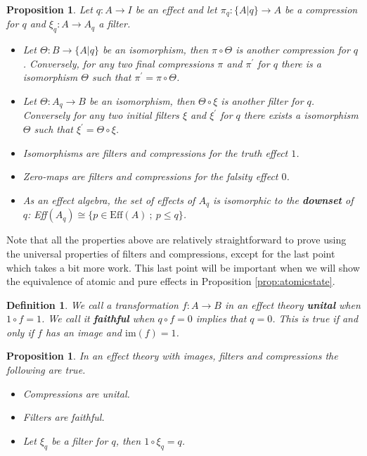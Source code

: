 \documentclass[b5paper,onecolumn,12pt,accepted=2019-05-03, issue=1, volume=1, shorttitle=papers/compositionality-1-1]{compositionalityarticle}
\newcounter{counter}
\numberwithin{counter}{section}
\newtheorem{proposition}[counter]{Proposition}
\newtheorem{definition}[counter]{Definition}
\newcommand{\im}[1]{\text{im}(#1)}
\begin{document}
\begin{proposition} \label{prop:quotcompr}
	\cite{cho2015introduction} Let $q:A\rightarrow I$ be an effect and let $\pi_q:\{A\lvert q\}\rightarrow A$ be a compression for $q$ and $\xi_q:A\rightarrow A_q$ a filter. 
	\begin{itemize}
		\item Let $\Theta:B\rightarrow \{A\lvert q\}$ be an isomorphism, then $\pi\circ \Theta$ is another compression for $q$. Conversely, for any two final compressions $\pi$ and $\pi^\prime$ for $q$ there is a isomorphism $\Theta$ such that $\pi^\prime = \pi\circ \Theta$.
		\item Let $\Theta:A_q\rightarrow B$ be an isomorphism, then $\Theta\circ \xi$ is another filter for $q$. Conversely for any two initial filters $\xi$ and $\xi^\prime$ for $q$ there exists a isomorphism $\Theta$ such that $\xi^\prime = \Theta\circ \xi$.
		\item Isomorphisms are filters and compressions for the truth effect $1$.
		\item Zero-maps are filters and compressions for the falsity effect $0$.
		\item As an effect algebra, the set of effects of $A_q$ is isomorphic to the \textbf{downset} of $q$: Eff$(A_q)\cong \{p \in \text{Eff}(A)~;~ p\leq q\}$.
	\end{itemize}
\end{proposition}

Note that all the properties above are relatively straightforward to prove using the universal properties of filters and compressions, except for the last point which takes a bit more work. This last point will be important when we will show the equivalence of atomic and pure effects in Proposition \ref{prop:atomicstate}.

\begin{definition}
	We call a transformation $f:A\rightarrow B$ in an effect theory \textbf{unital} when $1\circ f = 1$. We call it \textbf{faithful} when $q\circ f = 0$ implies that $q=0$. This is true if and only if $f$ has an image and $\im{f}=1$.
\end{definition}

\begin{proposition}\label{prop:faithfulfilters}
	\cite{cho2015introduction,basthesis} In an effect theory with images, filters and compressions the following are true.
	\begin{itemize}
		\item Compressions are unital.
		\item Filters are faithful.
        \item Let $\xi_q$ be a filter for $q$, then $1\circ \xi_q = q$.
	\end{itemize}
\end{proposition}
\end{document}
